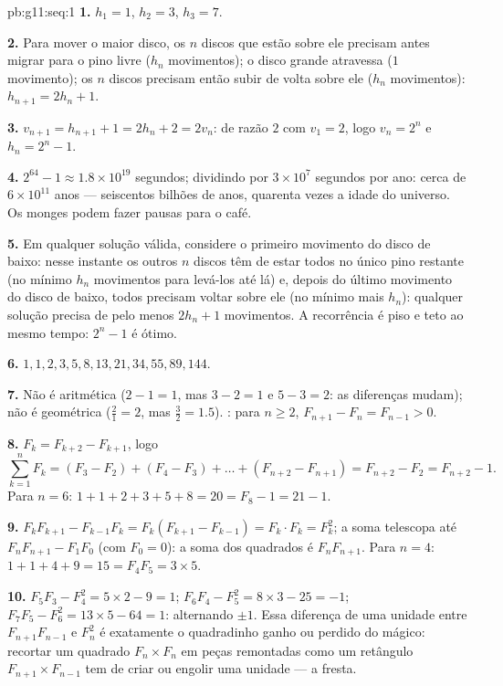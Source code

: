 \begin{solution}{pb:g11:seq:1}
\textbf{1.} $h_1 = 1$, $h_2 = 3$, $h_3 = 7$.

\textbf{2.} Para mover o maior disco, os $n$ discos que estão
sobre ele precisam antes migrar para o pino livre ($h_n$
movimentos); o disco grande atravessa ($1$ movimento); os $n$
discos precisam então subir de volta sobre ele ($h_n$
movimentos): $h_{n+1} = 2h_n + 1$.

\textbf{3.} $v_{n+1} = h_{n+1} + 1 = 2h_n + 2 = 2v_n$:
 de razão $2$ com $v_1 = 2$, logo
$v_n = 2^n$ e $h_n = 2^n - 1$.

\textbf{4.} $2^{64} - 1 \approx 1.8 \times 10^{19}$ segundos;
dividindo por $3 \times 10^7$ segundos por ano: cerca de
$6 \times 10^{11}$ anos --- seiscentos bilhões de anos,
quarenta vezes a idade do universo. Os monges podem fazer
pausas para o café.

\textbf{5.} Em qualquer solução válida, considere o primeiro
movimento do disco de baixo: nesse instante os outros $n$
discos têm de estar todos no único pino restante (no mínimo
$h_n$ movimentos para levá-los até lá) e, depois do último
movimento do disco de baixo, todos precisam voltar sobre ele
(no mínimo mais $h_n$): qualquer solução precisa de pelo menos
$2h_n + 1$ movimentos. A recorrência é piso e teto ao mesmo
tempo: $2^n - 1$ é ótimo.

\textbf{6.} $1, 1, 2, 3, 5, 8, 13, 21, 34, 55, 89, 144$.

\textbf{7.} Não é aritmética ($2 - 1 = 1$, mas $3 - 2 = 1$ e
$5 - 3 = 2$: as diferenças mudam); não é geométrica
($\frac21 = 2$, mas $\frac32 = 1.5$). : para
$n \geq 2$, $F_{n+1} - F_n = F_{n-1} > 0$.

\textbf{8.} $F_k = F_{k+2} - F_{k+1}$, logo
\[
\sum_{k=1}^{n} F_k = (F_3 - F_2) + (F_4 - F_3) + \dots +
(F_{n+2} - F_{n+1}) = F_{n+2} - F_2 = F_{n+2} - 1 .
\]
Para $n = 6$: $1 + 1 + 2 + 3 + 5 + 8 = 20 = F_8 - 1 = 21 - 1$.

\textbf{9.} $F_k F_{k+1} - F_{k-1} F_k = F_k (F_{k+1} -
F_{k-1}) = F_k \cdot F_k = F_k^2$; a soma telescopa até
$F_n F_{n+1} - F_1 F_0$ (com $F_0 = 0$): a soma dos quadrados é
$F_n F_{n+1}$. Para $n = 4$:
$1 + 1 + 4 + 9 = 15 = F_4 F_5 = 3 \times 5$.

\textbf{10.} $F_5 F_3 - F_4^2 = 5 \times 2 - 9 = 1$;
$F_6 F_4 - F_5^2 = 8 \times 3 - 25 = -1$;
$F_7 F_5 - F_6^2 = 13 \times 5 - 64 = 1$: alternando
$\pm 1$. Essa diferença de uma unidade entre $F_{n+1} F_{n-1}$
e $F_n^2$ é exatamente o quadradinho ganho ou perdido do
mágico: recortar um quadrado $F_n \times F_n$ em peças
remontadas como um retângulo $F_{n+1} \times F_{n-1}$ tem de
criar ou engolir uma unidade --- a fresta.


\end{solution}
